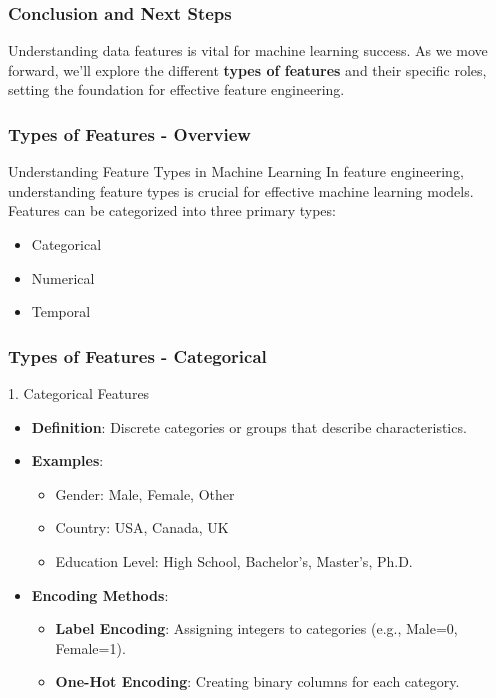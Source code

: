 \documentclass[aspectratio=169]{beamer}
\begin{document}
\begin{frame}[fragile]
    \frametitle{Conclusion and Next Steps}
    Understanding data features is vital for machine learning success. 
    As we move forward, we'll explore the different \textbf{types of features} and their specific roles, setting the foundation for effective feature engineering.
\end{frame}

\begin{frame}[fragile]
    \frametitle{Types of Features - Overview}
    \begin{block}{Understanding Feature Types in Machine Learning}
        In feature engineering, understanding feature types is crucial for effective machine learning models. Features can be categorized into three primary types:
        \begin{itemize}
            \item Categorical
            \item Numerical
            \item Temporal
        \end{itemize}
    \end{block}
\end{frame}

\begin{frame}[fragile]
    \frametitle{Types of Features - Categorical}
    \begin{block}{1. Categorical Features}
        \begin{itemize}
            \item \textbf{Definition}: Discrete categories or groups that describe characteristics.
            \item \textbf{Examples}:
            \begin{itemize}
                \item Gender: Male, Female, Other
                \item Country: USA, Canada, UK
                \item Education Level: High School, Bachelor's, Master's, Ph.D.
            \end{itemize}
            \item \textbf{Encoding Methods}:
            \begin{itemize}
                \item \textbf{Label Encoding}: Assigning integers to categories (e.g., Male=0, Female=1).
                \item \textbf{One-Hot Encoding}: Creating binary columns for each category.
            \end{itemize}
        \end{itemize}
    \end{block}
\end{frame}
\end{document}
